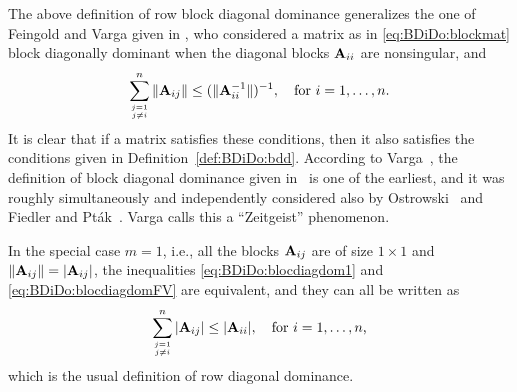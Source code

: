 The above definition of row block diagonal dominance generalizes the one of
Feingold and Varga given in \cite[Definition~1]{FeiVar62}, who considered a
matrix as in \eqref{eq:BDiDo:blockmat} block diagonally dominant when the
diagonal blocks $\mathbf{A}_{ii}$ are nonsingular, and
%
\begin{equation}\label{eq:BDiDo:blocdiagdomFV}
\sum_{\atopfrac{j=1}{j\neq i}}^{n}\|\A_{ij}\|\leq(\|\A_{ii}^{-1}\|)^{-1},\quad\text{for $i=1,\dots,n$}.
\end{equation}
%
It is clear that if a matrix satisfies these conditions, then it also satisfies
the conditions given in Definition~\ref{def:BDiDo:bdd}. According to
Varga~\cite[p.~156]{Var11}, the definition of block diagonal dominance given
in~\cite{FeiVar62} is one of the earliest, and it was roughly simultaneously
and independently considered also by Ostrowski~\cite{Ost61} and Fiedler and
Pt\'ak~\cite{FiePta62}. Varga calls this a ``Zeitgeist'' phenomenon.

{In} the special case $m=1$, i.e., all the blocks $\mathbf{A}_{ij}$ are of size
$1\times 1$ and $\|{\mathbf{A}_{ij}}\|=|\mathbf{A}_{ij}|$, the inequalities
\eqref{eq:BDiDo:blocdiagdom1} and \eqref{eq:BDiDo:blocdiagdomFV} are equivalent, and they
can all be written as
\[
\sum_{\atopfrac{j=1}{j\neq i}}^{n}|\A_{ij}|\leq |\A_{ii}|,\quad\text{for $i=1,\dots,n$,}
\]
which is the usual definition of row diagonal dominance.

